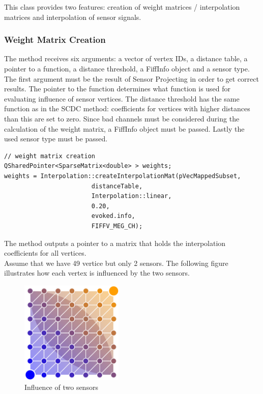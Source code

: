 This class provides two features: creation of weight matrices / interpolation matrices and interpolation of sensor signals.

\subsubsection{Weight Matrix Creation}

The method  receives six arguments: a vector of vertex IDs, a distance table, a pointer to a function, a distance threshold, a FiffInfo object and a sensor type. The first argument must be the result of Sensor Projecting in order to get correct results. The pointer to the function determines what function is used for evaluating influence of sensor vertices. The distance threshold has the same function as in the SCDC method: coefficients for vertices with higher distances than this are set to zero. Since bad channels must be considered during the calculation of the weight matrix, a FiffInfo object must be passed. Lastly the used sensor type must be passed. 

\begin{lstlisting}
// weight matrix creation
QSharedPointer<SparseMatrix<double> > weights;
weights = Interpolation::createInterpolationMat(pVecMappedSubset,
						distanceTable,
						Interpolation::linear,
						0.20,
						evoked.info,
						FIFFV_MEG_CH);
\end{lstlisting}

The method outputs a pointer to a matrix that holds the interpolation coefficients for all vertices.\\
Assume that we have 49 vertice but only 2 sensors. The following figure illustrates how each vertex is influenced by the two sensors.

\begin{figure}[h]
	\begin{center}
		\includegraphics[width=4.9cm]{figures/coefficients.png}
		\caption{Influence of two sensors}
	\end{center}
\end{figure}


